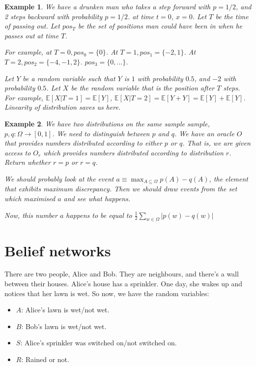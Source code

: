 \documentclass[11pt]{book}
\newcommand{\E}[1]{\ensuremath{\mathbb{E} \left[ #1 \right]}}
\newtheorem{example}{Example}
\begin{document}
\begin{example}
    We have a drunken man who takes a step forward with $p = 1/2$, and
    2 steps backward with probability $p = 1/2$. at time $t = 0$, $x = 0$.
    Let $T$ be the time of passing out. Let $pos_T$ be the set of positions
    man could have been in when he passes out at time $T$. 

    For example, at $T = 0, pos_0 = \{ 0 \}$. At $T = 1, pos_1 = \{ -2, 1 \}$. 
    At $T = 2, pos_2 = \{ -4, -1, 2 \}$. $pos_3 = \{ 0, \dots \}$. 


    Let $Y$ be a random variable such that $Y$ is $1$ with probability $0.5$,
    and $-2$ with probability $0.5$.  Let $X$ be the random variable that is
    the position after $T$ steps.  For example, $\E{X | T = 1} = \E{Y}$,  
    $\E{X | T = 2} = \E{Y + Y} = \E{Y} + \E{Y}$. Linearity of distribution saves
    us here.
\end{example}


\begin{example}
    We have two distributions on the same sample sample, $p, q: \Omega \rightarrow [0, 1]$.
    We need to distinguish between $p$ and $q$. We have an oracle $O$ that
    provides numbers distributed according to either $p$ or $q$. That is,
    we are given access to $O_r$ which provides numbers distributed according 
    to distribution $r$. Return whether $r = p$ or $r = q$.

    We should probably look at the event $a \equiv \max_{A \subseteq \Omega} p(A) - q(A)$,
    the element that exhibits maximum discrepancy. Then we should draw events
    from the set which maximised $a$ and see what happens.

    Now, this number $a$ happens to be equal to
    $\frac{1}{2} \sum_{w \in \Omega}  |p(w) - q(w)|$
\end{example}

\chapter{Belief networks}

There are two people, Alice and Bob. They are neighbours, and there's a wall
between their houses. Alice's house has a sprinkler. One day, she wakes up
and notices that her lawn is wet. So now, we have the random variables:

\begin{itemize}
    \item $A$: Alice's lawn is wet/not wet.
    \item $B$: Bob's lawn is wet/not wet.
    \item $S$: Alice's sprinkler was switched on/not switched on.
    \item $R$: Rained or not.
\end{itemize}
\end{document}
